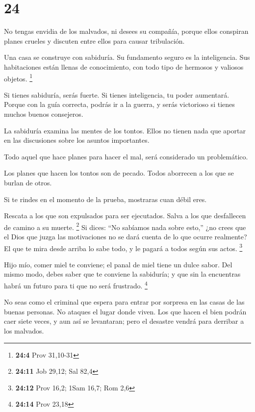 \hypertarget{section-23}{%
\section{24}\label{section-23}}

 No tengas envidia de los malvados, ni desees su compañía,
 porque ellos conspiran planes crueles y discuten entre
ellos para causar tribulación.

 Una casa se construye con sabiduría. Su fundamento seguro
es la inteligencia.  Sus habitaciones están llenas de
conocimiento, con todo tipo de hermosos y valiosos objetos. \footnote{\textbf{24:4}
  Prov 31,10-31}

 Si tienes sabiduría, serás fuerte. Si tienes inteligencia,
tu poder aumentará.  Porque con la guía correcta, podrás ir
a la guerra, y serás victorioso si tienes muchos buenos consejeros.

 La sabiduría examina las mentes de los tontos. Ellos no
tienen nada que aportar en las discusiones sobre los asuntos
importantes.

 Todo aquel que hace planes para hacer el mal, será
considerado un problemático.

 Los planes que hacen los tontos son de pecado. Todos
aborrecen a los que se burlan de otros.

 Si te rindes en el momento de la prueba, mostraras cuan
débil eres.

 Rescata a los que son expulsados para ser ejecutados.
Salva a los que desfallecen de camino a su muerte. \footnote{\textbf{24:11}
  Job 29,12; Sal 82,4}  Si dices: ``No sabíamos nada sobre
esto,'' ¿no crees que el Dios que juzga las motivaciones no se dará
cuenta de lo que ocurre realmente? El que te mira desde arriba lo sabe
todo, y le pagará a todos según sus actos. \footnote{\textbf{24:12} Prov
  16,2; 1Sam 16,7; Rom 2,6}

 Hijo mío, comer miel te conviene; el panal de miel tiene
un dulce sabor.  Del mismo modo, debes saber que te
conviene la sabiduría; y que sin la encuentras habrá un futuro para ti
que no será frustrado. \footnote{\textbf{24:14} Prov 23,18}

 No seas como el criminal que espera para entrar por
sorpresa en las casas de las buenas personas. No ataques el lugar donde
viven.  Los que hacen el bien podrán caer siete veces, y
aun así se levantaran; pero el desastre vendrá para derribar a los
malvados.

